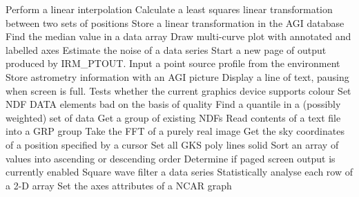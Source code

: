   {Perform a linear interpolation}
  {Calculate a least squares linear transformation between two sets of
   positions}
  {Store a linear transformation in the AGI database}
  {Find the median value in a data array}
  {Draw multi-curve plot with annotated and labelled axes}
  {Estimate the noise of a data series}
  {Start a new page of output produced by IRM\_PTOUT.}
  {Input a point source profile from the environment}
  {Store astrometry information with an AGI picture}
  {Display a line of text, pausing when screen is full.}
  {Tests whether the current graphics device supports colour}
  {Set NDF DATA elements bad on the basis of quality}
  {Find a quantile in a (possibly weighted) set of data}
  {Get a group of existing NDFs}
  {Read contents of a text file into a GRP group}
  {Take the FFT of a purely real image}
  {Get the sky coordinates of a position specified by a cursor}
  {Set all GKS poly lines solid}
  {Sort an array of values into ascending or descending order}
  {Determine if paged screen output is currently enabled}
  {Square wave filter a data series}
  {Statistically analyse each row of a 2-D array}
  {Set the axes attributes of a NCAR graph}
